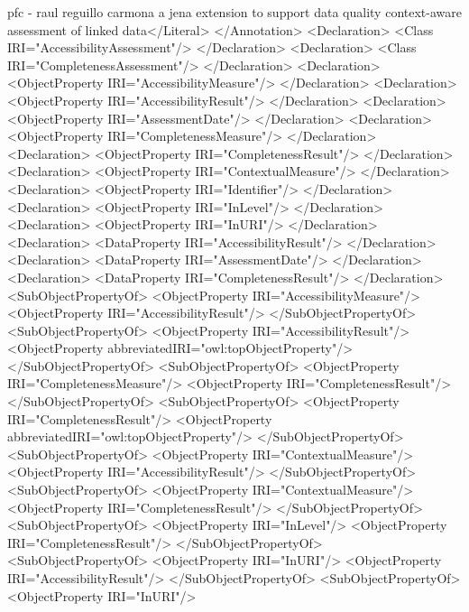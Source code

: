 \begin{listing}
pfc - raul reguillo carmona
a jena extension to support data quality context-aware assessment of linked data</Literal>
    </Annotation>
    <Declaration>
        <Class IRI="AccessibilityAssessment"/>
    </Declaration>
    <Declaration>
        <Class IRI="CompletenessAssessment"/>
    </Declaration>
    <Declaration>
        <ObjectProperty IRI="AccessibilityMeasure"/>
    </Declaration>
    <Declaration>
        <ObjectProperty IRI="AccessibilityResult"/>
    </Declaration>
    <Declaration>
        <ObjectProperty IRI="AssessmentDate"/>
    </Declaration>
    <Declaration>
        <ObjectProperty IRI="CompletenessMeasure"/>
    </Declaration>
    <Declaration>
        <ObjectProperty IRI="CompletenessResult"/>
    </Declaration>
    <Declaration>
        <ObjectProperty IRI="ContextualMeasure"/>
    </Declaration>
    <Declaration>
        <ObjectProperty IRI="Identifier"/>
    </Declaration>
    <Declaration>
        <ObjectProperty IRI="InLevel"/>
    </Declaration>
    <Declaration>
        <ObjectProperty IRI="InURI"/>
    </Declaration>
    <Declaration>
        <DataProperty IRI="AccessibilityResult"/>
    </Declaration>
    <Declaration>
        <DataProperty IRI="AssessmentDate"/>
    </Declaration>
    <Declaration>
        <DataProperty IRI="CompletenessResult"/>
    </Declaration>
    <SubObjectPropertyOf>
        <ObjectProperty IRI="AccessibilityMeasure"/>
        <ObjectProperty IRI="AccessibilityResult"/>
    </SubObjectPropertyOf>
    <SubObjectPropertyOf>
        <ObjectProperty IRI="AccessibilityResult"/>
        <ObjectProperty abbreviatedIRI="owl:topObjectProperty"/>
    </SubObjectPropertyOf>
    <SubObjectPropertyOf>
        <ObjectProperty IRI="CompletenessMeasure"/>
        <ObjectProperty IRI="CompletenessResult"/>
    </SubObjectPropertyOf>
    <SubObjectPropertyOf>
        <ObjectProperty IRI="CompletenessResult"/>
        <ObjectProperty abbreviatedIRI="owl:topObjectProperty"/>
    </SubObjectPropertyOf>
    <SubObjectPropertyOf>
        <ObjectProperty IRI="ContextualMeasure"/>
        <ObjectProperty IRI="AccessibilityResult"/>
    </SubObjectPropertyOf>
    <SubObjectPropertyOf>
        <ObjectProperty IRI="ContextualMeasure"/>
        <ObjectProperty IRI="CompletenessResult"/>
    </SubObjectPropertyOf>
    <SubObjectPropertyOf>
        <ObjectProperty IRI="InLevel"/>
        <ObjectProperty IRI="CompletenessResult"/>
    </SubObjectPropertyOf>
    <SubObjectPropertyOf>
        <ObjectProperty IRI="InURI"/>
        <ObjectProperty IRI="AccessibilityResult"/>
    </SubObjectPropertyOf>
    <SubObjectPropertyOf>
        <ObjectProperty IRI="InURI"/>

\end{listing}
